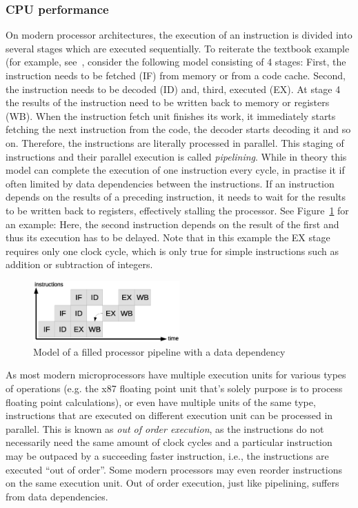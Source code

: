 \subsubsection{CPU performance}
On modern processor architectures, the execution of an instruction is divided into several stages which are executed sequentially. To reiterate the textbook example (for example, see~\cite[p. 411]{murdocca1999computer}, consider the following model consisting of 4 stages: First, the instruction needs to be fetched (IF) from memory or from a code cache. Second, the instruction needs to be decoded (ID) and, third, executed (EX). At stage 4 the results of the instruction need to be written back to memory or registers (WB). When the instruction fetch unit finishes its work, it immediately starts fetching the next instruction from the code, the decoder starts decoding it and so on. Therefore, the instructions are literally processed in parallel. This staging of instructions and their parallel execution is called \emph{pipelining}. While in theory this model can complete the execution of one instruction every cycle, in practise it if often limited by data dependencies between the instructions. If an instruction depends on the results of a preceding instruction, it needs to wait for the results to be written back to registers, effectively stalling the processor. See Figure~\ref{fig:pipeline} for an example: Here, the second instruction depends on the result of the first and thus its execution has to be delayed. Note that in this example the EX stage requires only one clock cycle, which is only true for simple instructions such as addition or subtraction of integers.

\begin{figure}[h]
\begin{center}
\includegraphics[width=0.5\textwidth]{img/pipeline}
\end{center}
\caption{Model of a filled processor pipeline with a data dependency}
\label{fig:pipeline}
\end{figure}

As most modern microprocessors have multiple execution units for various types of operations (e.g. the x87 floating point unit that's solely purpose is to process floating point calculations), or even have multiple units of the same type, instructions that are executed on different execution unit can be processed in parallel. This is known as \emph{out of order execution}, as the instructions do not necessarily need the same amount of clock cycles and a particular instruction may be outpaced by a succeeding faster instruction, i.e., the instructions are executed ``out of order''. Some modern processors may even reorder instructions on the same execution unit. Out of order execution, just like pipelining, suffers from data dependencies.

